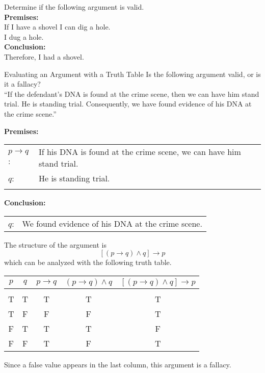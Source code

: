 \begin{try}
Determine if the following argument is valid.\\

\textbf{Premises:}\\
If I have a shovel I can dig a hole.\\
I dug a hole.\\

\textbf{Conclusion:}\\
Therefore, I had a shovel.
\end{try}
\vfill
\pagebreak

\begin{example}[https://www.youtube.com/watch?v=pCnvn2-nENk]{Evaluating an Argument with a Truth Table}
Is the following argument valid, or is it a fallacy?\\

``If the defendant's DNA is found at the crime scene, then we can have him stand trial.  He is standing trial.  Consequently, we have found evidence of his DNA at the crime scene.''

\sol
\textbf{Premises:}\\
\begin{tabular}{l l}
$p \to q$: & If his DNA is found at the crime scene, we can have him stand trial.\\
$q$: & He is standing trial.\\
& \\
\end{tabular}

\textbf{Conclusion:}\\
\begin{tabular}{l l}
$q$: & We found evidence of his DNA at the crime scene.
\end{tabular}

The structure of the argument is \[[(p \to q) \wedge q] \to p\]
which can be analyzed with the following truth table.
\begin{center}
\begin{tabular}{|c c c c c|}
\hline
$p$ & $q$ & $p \to q$ & $(p \to q) \wedge q$ & $[(p \to q) \wedge q] \to p$\\
\hline
& & & & \\
T & T & T & T & T\\
T & F & F & F & T\\
F & T & T & T & F\\
F & F & T & F & T\\
\hline
\end{tabular}
\end{center}

Since a false value appears in the last column, this argument is a fallacy.
\end{example}

